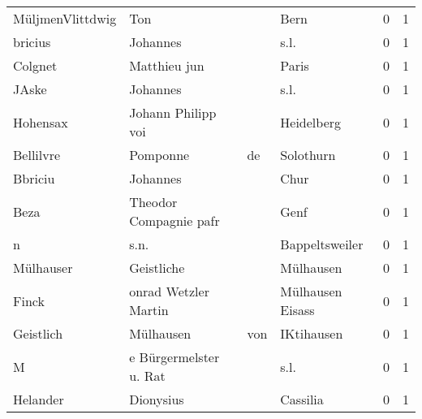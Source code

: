 \begin{center}
\begin{tiny}
\begin{longtabu}{llllrr}
         MüljmenVlittdwig &                                Ton &             &                                        Bern &          0 &         1 \\
                  bricius &                           Johannes &             &                                        s.l. &          0 &         1 \\
                  Colgnet &                       Matthieu jun &             &                                       Paris &          0 &         1 \\
                    JAske &                           Johannes &             &                                        s.l. &          0 &         1 \\
                 Hohensax &                 Johann Philipp voi &             &                                  Heidelberg &          0 &         1 \\
                Bellilvre &                           Pomponne &          de &                                   Solothurn &          0 &         1 \\
                  Bbriciu &                           Johannes &             &                                        Chur &          0 &         1 \\
                     Beza &             Theodor Compagnie pafr &             &                                        Genf &          0 &         1 \\
                        n &                               s.n. &             &                              Bappeltsweiler &          0 &         1 \\
                Mülhauser &                         Geistliche &             &                                   Mülhausen &          0 &         1 \\
                    Finck &               onrad Wetzler Martin &             &                            Mülhausen Eisass &          0 &         1 \\
                Geistlich &                          Mülhausen &         von &                                  IKtihausen &          0 &         1 \\
                        M &             e Bürgermelster u. Rat &             &                                        s.l. &          0 &         1 \\
                 Helander &                          Dionysius &             &                                    Cassilia &          0 &         1 \\

\end{longtabu}
\end{tiny}
\end{center}

